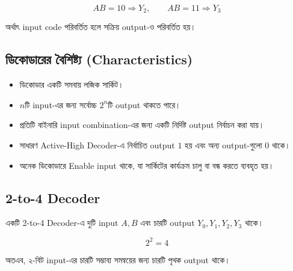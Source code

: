 \[
AB=10\Rightarrow Y_2,
\qquad
AB=11\Rightarrow Y_3
\]

অর্থাৎ \textenglish{input code} পরিবর্তিত হলে সক্রিয়
\textenglish{output}-ও পরিবর্তিত হয়।


\subsection{ডিকোডারের বৈশিষ্ট্য
(\textenglish{Characteristics})}

\begin{itemize}[label={{\bulletfont\textbullet}}, leftmargin=*, nosep]

\item
ডিকোডার একটি সমবায় লজিক সার্কিট।

\item
\(n\)টি \textenglish{input}-এর জন্য সর্বোচ্চ
\(2^n\)টি \textenglish{output} থাকতে পারে।

\item
প্রতিটি বাইনারি \textenglish{input combination}-এর জন্য
একটি নির্দিষ্ট \textenglish{output} নির্বাচন করা যায়।

\item
সাধারণ \textenglish{Active-High Decoder}-এ নির্বাচিত
\textenglish{output} \(1\) হয় এবং অন্য
\textenglish{output}-গুলো \(0\) থাকে।

\item
অনেক ডিকোডারে \textenglish{Enable input} থাকে,
যা সার্কিটের কার্যক্রম চালু বা বন্ধ করতে ব্যবহৃত হয়।

\end{itemize}


\subsection{\textenglish{2-to-4 Decoder}}

একটি \textenglish{2-to-4 Decoder}-এ দুটি
\textenglish{input} \(A,B\) এবং চারটি
\textenglish{output} \(Y_0,Y_1,Y_2,Y_3\) থাকে।

\[
2^2=4
\]

অতএব, ২-বিট \textenglish{input}-এর চারটি সম্ভাব্য সমন্বয়ের জন্য
চারটি পৃথক \textenglish{output} থাকে।

